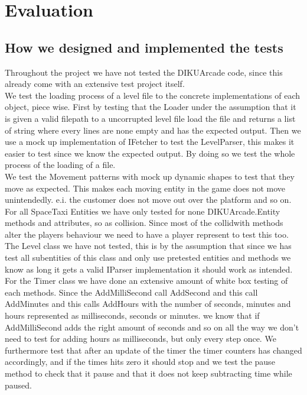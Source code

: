 \documentclass[../master.tex]{subfile}
\begin{document}
\section{Evaluation}
\subsection{How we designed and implemented the tests}
Throughout the project we have not tested the DIKUArcade code, since this already come with an extensive test project itself.
\\[10pt]
We test the loading process of a level file to the concrete implementations of each object, piece wise.
First by testing that the Loader under the assumption that it is given a valid filepath to a uncorrupted level file load the file and returns a list of string where every lines are none empty and has the expected output. Then we use a mock up implementation of IFetcher to test the LevelParser, this makes it easier to test since we know the expected output. By doing so we test the whole process of the loading of a file.
\\[10pt]
We test the Movement patterns with mock up dynamic shapes to test that they move as expected. This makes each moving entity in the game does not move unintendedly. e.i. the customer does not move out over the platform and so on.
\\[10pt]
For all SpaceTaxi Entities we have only tested for none DIKUArcade.Entity methods and attributes, so as collision. Since most of the collidwith methods alter the players behaviour we need to have a player represent to test this too.
\\[10pt]
The Level class we have not tested, this is by the assumption that since we has test all subentities of this class and only use pretested entities and methods we know as long it gets a valid IParser implementation it should work as intended.
\\[10pt]
For the Timer class we have done an extensive amount of white box testing of each methods. Since the AddMilliSecond call AddSecond and this call AddMinutes and this calls AddHours with the number of seconds, minutes and hours represented as milliseconds, seconds or minutes. we know that if AddMilliSecond adds the right amount of seconds and so on all the way we don't need to test for adding hours as milliseconds, but only every step once. We furthermore test that after an update of the timer the timer counters has changed accordingly, and if the times hits zero it should stop and we test the pause method to check that it pause and that it does not keep subtracting time while paused.
\end{document}
